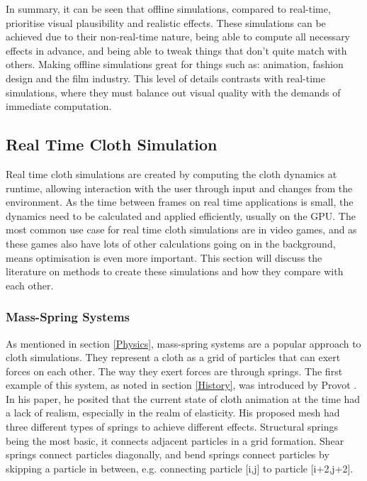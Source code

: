 \documentclass[12pt,a4paper]{article}
\begin{document}
In summary, it can be seen that offline simulations, compared to real-time, prioritise visual plausibility and realistic effects. These simulations can be achieved due to their non-real-time nature, being able to compute all necessary effects in advance, and being able to tweak things that don't quite match with others. Making offline simulations great for things such as: animation, fashion design and the film industry. This level of details contrasts with real-time simulations, where they must balance out visual quality with the demands of immediate computation.


\subsection{Real Time Cloth Simulation}
Real time cloth simulations are created by computing the cloth dynamics at runtime, allowing interaction with the user through input and changes from the environment. As the time between frames on real time applications is small, the dynamics need to be calculated and applied efficiently, usually on the GPU. The most common use case for real time cloth simulations are in video games, and as these games also have lots of other calculations going on in the background, means optimisation is even more important. This section will discuss the literature on methods to create these simulations and how they compare with each other. \\
\subsubsection{Mass-Spring Systems}
\label{Mass-Spring}
As mentioned in section \ref{Physics}, mass-spring systems are a popular approach to cloth simulations. They represent a cloth as a grid of particles that can exert forces on each other. The way they exert forces are through springs. The first example of this system, as noted in section \ref{History}, was introduced by Provot \cite{provot1995deformation}.\\

In his paper, he posited that the current state of cloth animation at the time had a lack of realism, especially in the realm of elasticity. His proposed mesh had three different types of springs to achieve different effects. Structural springs being the most basic, it connects adjacent particles in a grid formation. Shear springs connect particles diagonally, and bend springs connect particles by skipping a particle in between, e.g. connecting particle [i,j] to particle [i+2,j+2]. \\
\end{document}
